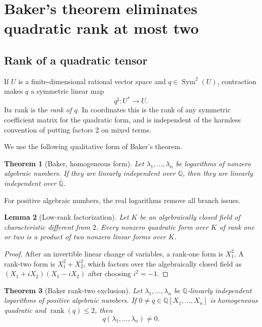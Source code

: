 \documentclass[11pt]{article}
\newtheorem{theorem}{Theorem}[section]
\newtheorem{lemma}[theorem]{Lemma}
\theoremstyle{definition}
\theoremstyle{remark}
\newcommand{\Q}{\mathbb{Q}}
\newcommand{\Qbar}{\overline{\mathbb{Q}}}
\newcommand{\rank}{\operatorname{rank}}
\newcommand{\Sym}{\operatorname{Sym}}
\begin{document}
\section{Baker's theorem eliminates quadratic rank at most two}
\label{sec:baker-rank}

\subsection{Rank of a quadratic tensor}

If $U$ is a finite-dimensional rational vector space and $q\in\Sym^2(U)$, contraction makes
$q$ a symmetric linear map
\[
 q^\sharp:U^*\longrightarrow U.
\]
Its rank is the \emph{rank of $q$}.  In coordinates this is the rank of any symmetric
coefficient matrix for the quadratic form, and is independent of the harmless convention
of putting factors $2$ on mixed terms.

We use the following qualitative form of Baker's theorem.

\begin{theorem}[Baker, homogeneous form]
\label{thm:baker}
Let $\lambda_1,\ldots,\lambda_n$ be logarithms of nonzero algebraic numbers.  If they are
linearly independent over $\Q$, then they are linearly independent over $\Qbar$.
\end{theorem}

For positive algebraic numbers, the real logarithms remove all branch issues.

\begin{lemma}[Low-rank factorization]
\label{lem:low-rank-factor}
Let $K$ be an algebraically closed field of characteristic different from $2$.  Every
nonzero quadratic form over $K$ of rank one or two is a product of two nonzero linear forms
over $K$.
\end{lemma}

\begin{proof}
After an invertible linear change of variables, a rank-one form is $X_1^2$.  A rank-two form
is $X_1^2+X_2^2$, which factors over the algebraically closed field as
$(X_1+iX_2)(X_1-iX_2)$ after choosing $i^2=-1$.
\end{proof}

\begin{theorem}[Baker rank-two exclusion]
\label{thm:baker-rank-two}
Let $\lambda_1,\ldots,\lambda_n$ be $\Q$-linearly independent logarithms of positive
algebraic numbers.  If $0\ne q\in\Q[X_1,\ldots,X_n]$ is homogeneous quadratic and
$\rank(q)\le2$, then
\[
 q(\lambda_1,\ldots,\lambda_n)\ne0.
\]
\end{theorem}
\end{document}
